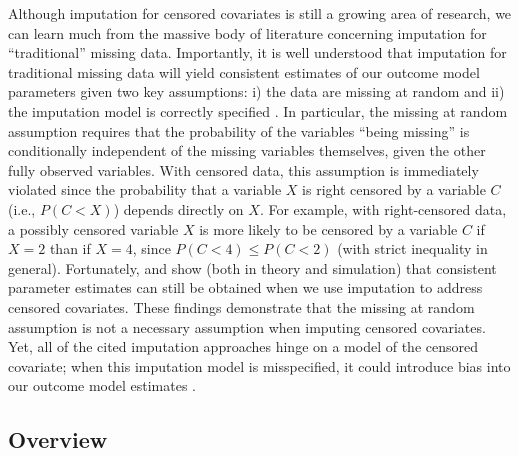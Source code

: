 \documentclass[12pt]{article}
\begin{document}
Although imputation for censored covariates is still a growing area of research, we can learn much from the massive body of literature concerning imputation for ``traditional'' missing data. Importantly, it is well understood that imputation for traditional missing data will yield consistent estimates of our outcome model parameters given two key assumptions: i) the data are missing at random and ii) the imputation model is correctly specified \citep{little2019statistical}. In particular, the missing at random assumption requires that the probability of the variables ``being missing'' is conditionally independent of the missing variables themselves, given the other fully observed variables.
With censored data, this assumption is immediately violated since the probability that a variable $X$ is right censored by a variable $C$ (i.e., $P(C<X)$) depends directly on $X$. For example, with right-censored data, a possibly censored variable $X$ is more likely to be censored by a variable $C$ if $X=2$ than if $X=4$, since $P(C<4)\leq P(C<2)$ (with strict inequality in general). Fortunately, \cite{Bernhardt2014} and \cite{Wang2012} show (both in theory and simulation) that consistent parameter estimates can still be obtained when we use imputation to address censored covariates. These findings demonstrate that the missing at random assumption is not a necessary assumption when imputing censored covariates. Yet, all of the cited imputation approaches hinge on a model of the censored covariate; when this imputation model is misspecified, it could introduce bias into our outcome model estimates \citep{yucel2010impact, black2011missing}. 

\subsection{Overview}
\end{document}
